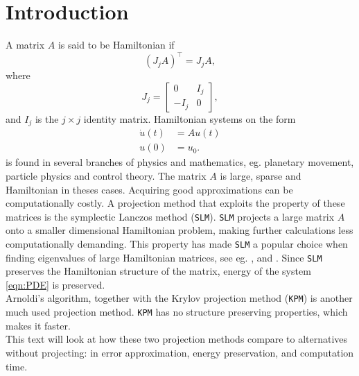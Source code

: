 \chapter{Introduction} %
A matrix $A$ is said to be Hamiltonian if  \cite{Hamiltonian}
\begin{equation*}
(J_jA)^{\top} = J_j A,
\end{equation*}
where
\begin{equation*}
J_j = 
\begin{bmatrix}
0&I_j\\-I_j&0
\end{bmatrix},
\end{equation*}
and $I_j$ is the $j \times j$ identity matrix.
Hamiltonian systems on the form 
\begin{equation} 
\begin{aligned}
\dot{u}(t) &= A u(t)\\
u(0)&= u_0.
\end{aligned}
\label{eqn:PDE}
\end{equation} is found in several branches of physics and mathematics, eg. planetary movement, particle physics and control theory.
The matrix $A$ is large, sparse and Hamiltonian in theses cases. Acquiring good approximations can be computationally costly. A projection method that exploits the property of these matrices is the symplectic Lanczos method (\texttt{SLM}). \texttt{SLM} projects a large matrix $A$ onto a smaller dimensional Hamiltonian problem, making further calculations less computationally demanding. This property has made \texttt{SLM} a popular choice when finding eigenvalues of large Hamiltonian matrices, see eg. \cite{SLM1}, \cite{SLM2} and \cite{SLM3}. Since \texttt{SLM} preserves the Hamiltonian structure of the matrix, energy of the system \eqref{eqn:PDE} is preserved.\\
Arnoldi's algorithm, together with the Krylov projection method (\texttt{KPM}) is another much used projection method. \texttt{KPM} has no structure preserving properties, which makes it faster. \\
This text will look at how these two projection methods compare to alternatives without projecting: in error approximation, energy preservation, and computation time. \\
